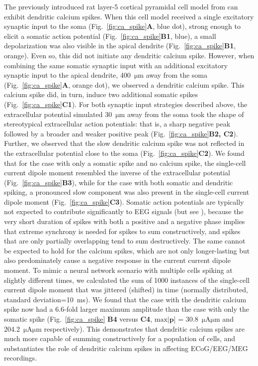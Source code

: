 \documentclass[preprint,10pt,authoryear]{elsarticle}
\begin{document}
The previously introduced rat layer-5 cortical pyramidal cell model from \cite{HAY2011} can exhibit dendritic calcium spikes.
When this cell model received a single excitatory synaptic input to the soma (Fig.~\ref{fig:ca_spike}\textbf{A}, blue dot), strong enough to elicit a somatic action potential (Fig.~\ref{fig:ca_spike}\textbf{B1}, blue), a small depolarization was also visible in the apical dendrite (Fig.~\ref{fig:ca_spike}\textbf{B1}, orange). Even so, this did not initiate any dendritic calcium spike. However, when combining the same somatic synaptic input with an additional excitatory synaptic input to the apical dendrite, 400~$\si{\um}$ away from the soma (Fig.~\ref{fig:ca_spike}\textbf{A}, orange dot), we observed a dendritic calcium spike. This calcium spike did, in turn, induce two additional somatic spikes (Fig.~\ref{fig:ca_spike}\textbf{C1}).
For both synaptic input strategies described above, the extracellular potential simulated 30~$\si{\um}$ away from the soma took the shape of stereotypical extracellular action potentials: that is, a sharp negative peak followed by a broader and weaker positive peak (Fig.~\ref{fig:ca_spike}\textbf{B2, C2}). Further, we observed that the slow dendritic calcium spike was not reflected in the extracellular potential close to the soma (Fig.~\ref{fig:ca_spike}\textbf{C2}).
We found that for the case with only a somatic spike and no calcium spike, the single-cell current dipole moment resembled the inverse of the extracellular potential (Fig.~\ref{fig:ca_spike}\textbf{B3}), while for the case with both somatic and dendritic spiking, a pronounced slow component was also present in the single-cell current dipole moment (Fig.~\ref{fig:ca_spike}\textbf{C3}).
Somatic action potentials are typically not expected to contribute significantly to EEG signals (but see \cite{TELENCZUK2015}), because the very short duration of spikes with both a positive and a negative phase implies that extreme synchrony is needed for spikes to sum constructively, and spikes that are only partially overlapping tend to sum destructively. The same cannot be expected to hold for the calcium spikes, which are not only longer-lasting but also predominately cause a negative response in the current current dipole moment. 
To mimic a neural network scenario with multiple cells spiking at slightly different times, we calculated the sum of 1000 instances of the single-cell current dipole moment that was jittered (shifted) in time (normally distributed, standard deviation=10~ms).
We found that the case with the dendritic calcium spike now had a $6.6$-fold larger maximum amplitude than the case with
only the somatic spike (Fig.~\ref{fig:ca_spike} \textbf{B4} versus \textbf{C4}, 
$\mathrm{max}|\mathbf{p}$| = 30.8~$\si{\uA}\si{\um}$ and 204.2~$\si{\uA}\si{\um}$ respectively).
This demonstrates that dendritic calcium spikes are much more capable of summing constructively for a population of cells, and substantiates the role of dendritic calcium spikes in affecting ECoG/EEG/MEG recordings. 
\end{document}
